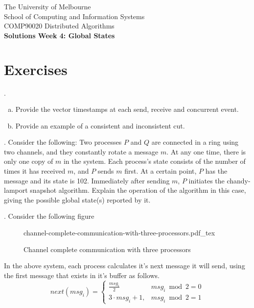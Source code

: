 \documentclass[12pt]{article}
\newcommand{\incfig}[2][1]{%
    \def\svgwidth{#1\columnwidth}
    {#2.pdf_tex}
}
\newcounter{question}
\newcommand{\question}[1]{
    \stepcounter{question}
    \thequestion. #1 \hfill
}
\begin{document}
\begin{center}
    {\sc The University of Melbourne
        \\
        School of Computing and Information Systems
        \\
    COMP90020 Distributed Algorithms}
    \bigskip \\
    {\Large\bf Solutions Week 4: Global States}
\end{center}

\section*{Exercises}

\setcounter{question}{14}

\question{    \begin{enumerate}[(a)]


        \item Provide the vector timestamps at each send, receive and concurrent event.
        \item Provide an example of a consistent and inconsistent cut.
    \end{enumerate}
}

\pagebreak

\question{Consider the following: Two processes $P$ and $Q$ are connected in a ring using two channels, and they constantly rotate a message $m$. At any one time, there is only one copy of $m$ in the system. Each process’s state consists of the number of times it has received $m$, and $P$ sends $m$ first. At a certain point, $P$ has the message and its state is 102. Immediately after sending $m$, $P$ initiates the chandy-lamport snapshot algorithm. Explain the operation of the algorithm in this case, giving the possible global state(s) reported by it.}


\question{Consider the following figure}

\begin{figure}[ht]
    \centering
    \incfig{channel-complete-communication-with-three-processors}
    \caption{Channel complete communication with three processors}
    \label{fig:channel-complete-communication-with-three-processors}
\end{figure}

In the above system, each process calculates it's next message it will send, using the first message that exists in it's buffer as follows.
\[
    next(msg_{i}) = \begin{cases}
        \frac{msg_i}{2}  & msg_i \bmod 2 = 0 \\
        3 \cdot msg_i + 1, & msg_i \bmod 2 = 1
    \end{cases}
\]
\end{document}
